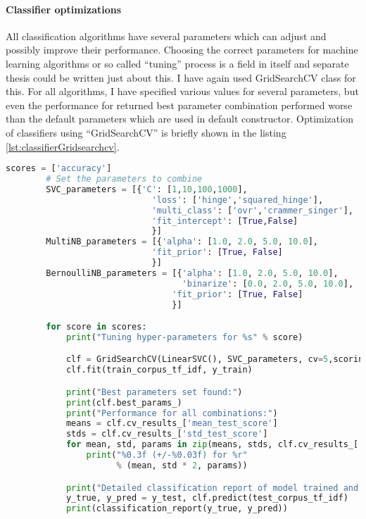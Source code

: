 \paragraph{Classifier optimizations}
All classification algorithms have several parameters which can adjust and possibly improve their performance. Choosing the correct parameters for machine learning algorithms or so called “tuning” process is a field in itself and separate thesis could be written just about this. I have again used GridSearchCV class for this. For all algorithms, I have specified various values for several parameters, but even the performance for returned best parameter combination performed worse than the default parameters which are used in default constructor. Optimization of classifiers using “GridSearchCV” is briefly shown in the listing \ref{lst:classifierGridsearchcv}.

\begin{lstlisting}[caption={Tuning of classifiers using “GridSearchCV” class },label={lst:classifierGridsearchcv},language=Python]
    	scores = ['accuracy']
        # Set the parameters to combine
        SVC_parameters = [{'C': [1,10,100,1000],
                             'loss': ['hinge','squared_hinge'],
                             'multi_class': ['ovr','crammer_singer'],
                             'fit_intercept': [True,False]
                             }]
        MultiNB_parameters = [{'alpha': [1.0, 2.0, 5.0, 10.0],
                             'fit_prior': [True, False]
                             }]
        BernoulliNB_parameters = [{'alpha': [1.0, 2.0, 5.0, 10.0],
                                   'binarize': [0.0, 2.0, 5.0, 10.0],
                                 'fit_prior': [True, False]
                                 }]

        for score in scores:
            print("Tuning hyper-parameters for %s" % score)

            clf = GridSearchCV(LinearSVC(), SVC_parameters, cv=5,scoring='%s' % score)
            clf.fit(train_corpus_tf_idf, y_train)

            print("Best parameters set found:")
            print(clf.best_params_)
            print("Performance for all combinations:")
            means = clf.cv_results_['mean_test_score']
            stds = clf.cv_results_['std_test_score']
            for mean, std, params in zip(means, stds, clf.cv_results_['params']):
                print("%0.3f (+/-%0.03f) for %r"
                      % (mean, std * 2, params))

            print("Detailed classification report of model trained and evaluated on full dev/eval sets:")
            y_true, y_pred = y_test, clf.predict(test_corpus_tf_idf)
            print(classification_report(y_true, y_pred))
\end{lstlisting}    


